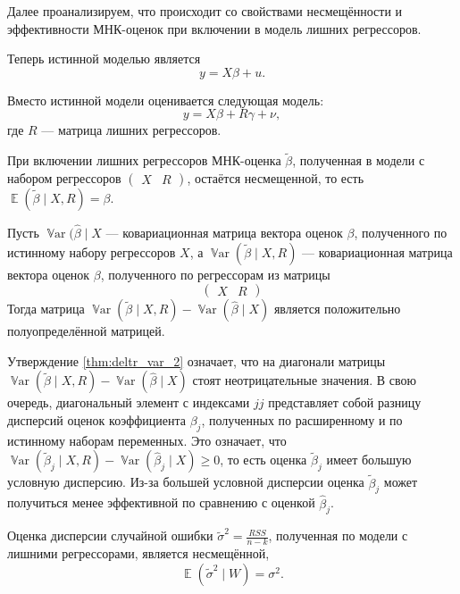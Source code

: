 \documentclass[12pt]{article}
\DeclareMathOperator{\Var}{\mathbb{V}ar}
\DeclareMathOperator{\E}{\mathbb{E}}
\newcommand{\hb}{\hat{\beta}}
\newcommand{\tb}{\tilde{\beta}}
\newcommand{\RSS}{RSS}
\begin{document}
Далее проанализируем, что происходит со свойствами несмещённости и эффективности МНК-оценок при включении в модель лишних регрессоров.

Теперь истинной моделью является
\[
y = X\beta + u.
\]

Вместо истинной модели оценивается следующая модель:
\[
y = X\beta + R\gamma + \nu,
\]
где $R$ — матрица лишних регрессоров.

\begin{lemma}
При включении лишних регрессоров МНК-оценка $\tb$, полученная в модели с набором регрессоров 
$\begin{pmatrix} X & R\end{pmatrix}$, 
остаётся несмещенной, то есть $\E(\tb \mid X, R) = \beta$.
\end{lemma}

\begin{lemma}
\label{thm:deltr_var_2}
Пусть $\Var(\hb \mid X$ — ковариационная матрица вектора оценок $\beta$, полученного по истинному набору регрессоров $X$, а $\Var(\tb \mid X,R)$ — ковариационная матрица вектора оценок $\beta$, полученного по регрессорам  из матрицы 
\[
\begin{pmatrix} X & R\end{pmatrix}
\]
Тогда матрица $\Var(\tb \mid X, R) - \Var(\hb \mid X)$ является положительно полуопределённой матрицей.
\end{lemma}

Утверждение \ref{thm:deltr_var_2} означает, что на диагонали матрицы $\Var(\tb \mid X, R) - \Var(\hb \mid X)$ стоят неотрицательные значения. 
В свою очередь, диагональный элемент с индексами ${jj}$ представляет собой разницу дисперсий оценок коэффициента $\beta_j$, полученных по расширенному и по истинному наборам переменных. 
Это означает, что $\Var(\tb_j \mid X, R) - \Var(\hb_j \mid X) \geq 0$, то есть оценка $\tb_j$ имеет большую условную дисперсию. 
Из-за большей условной дисперсии оценка $\tb_j$ может получиться менее эффективной по сравнению с оценкой $\hb_j$.

\begin{lemma}
    Оценка дисперсии случайной ошибки $\tilde\sigma^2 = \frac{\RSS}{n-k}$, полученная по модели с лишними регрессорами, является несмещённой,
    \[
    \E(\tilde\sigma^2 \mid W) = \sigma^2.
    \]
\end{lemma}
\end{document}
